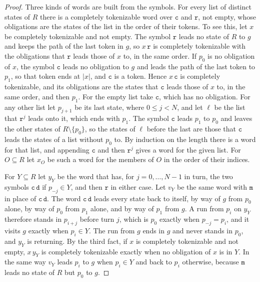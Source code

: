 \documentclass[11pt,a4paper]{article}
\theoremstyle{definition}
\theoremstyle{plain}
\newcommand{\code}[1]{\texttt{#1}}
\begin{document}
\begin{proof}
Three kinds of words are built from the symbols. For every list of distinct states of $R$ there is a completely
tokenizable word over $\code{c}$ and $\code{r}$, not empty, whose obligations are the states of the list in the order of
their tokens. To see this, let $x$ be completely tokenizable and not empty. The symbol $\code{r}$ leads no state of $R$
to $g$ and keeps the path of the last token in $g$, so $x\,\code{r}$ is completely tokenizable with the obligations that
$\code{r}$ leads those of $x$ to, in the same order. If $p_0$ is no obligation of $x$, the symbol $\code{c}$ leads no
obligation to $g$ and leads the path of the last token to $p_1$, so that token ends at $|x|$, and $\code{c}$ is a token.
Hence $x\,\code{c}$ is completely tokenizable, and its obligations are the states that $\code{c}$ leads those of $x$ to,
in the same order, and then $p_1$. For the empty list take $\code{c}$, which has no obligation. For any other list let
$p_{j+1}$ be its last state, where $0 \leq j < N$, and let $\ell$ be the list that $\code{r}^j$ leads onto it, which
ends with $p_1$. The symbol $\code{c}$ leads $p_1$ to $p_0$ and leaves the other states of $R \setminus \{p_0\}$, so the
states of $\ell$ before the last are those that $\code{c}$ leads the states of a list without $p_0$ to. By induction on
the length there is a word for that list, and appending $\code{c}$ and then $\code{r}^j$ gives a word for the given
list. For $O \subseteq R$ let $x_O$ be such a word for the members of $O$ in the order of their indices.

For $Y \subseteq R$ let $y_Y$ be the word that has, for $j = 0, \ldots, N - 1$ in turn, the two symbols
$\code{c}\,\code{d}$ if $p_{-j} \in Y$, and then $\code{r}$ in either case. Let $v_Y$ be the same word with $\code{m}$
in place of $\code{c}\,\code{d}$. The word $\code{c}\,\code{d}$ leads every state back to itself, by way of $g$ from
$p_0$ alone, by way of $p_0$ from $p_1$ alone, and by way of $p_1$ from $g$. A run from $p_i$ on $y_Y$ therefore stands
in $p_{i+j}$ before turn $j$, which is $p_0$ exactly when $p_{-j} = p_i$, and it visits $g$ exactly when $p_i \in Y$.
The run from $g$ ends in $g$ and never stands in $p_0$, and $y_Y$ is returning. By the third fact, if $x$ is completely
tokenizable and not empty, $x\,y_Y$ is completely tokenizable exactly when no obligation of $x$ is in $Y$. In the same
way $v_Y$ leads $p_i$ to $g$ when $p_i \in Y$ and back to $p_i$ otherwise, because $\code{m}$ leads no state of $R$ but
$p_0$ to $g$.


\end{proof}
\end{document}
